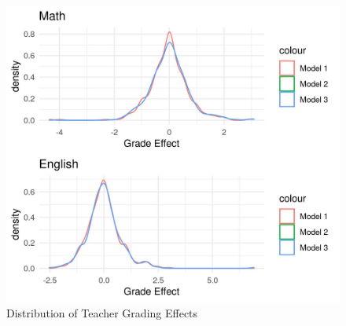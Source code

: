 \documentclass{article}
\begin{document}
	\begin{figure}[h]
		\caption{Distribution of Teacher Grading Effects}
		\centering
		\includegraphics{Grade_Effect_Density.jpeg}
	\end{figure}

	
\end{document}
